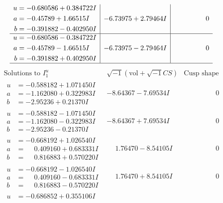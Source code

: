 \documentclass[1p]{elsarticle_modified}
\theoremstyle{definition}
\newcommand{\I}{\sqrt{-1}}
\begin{document}
$$\begin{array}{c|c|c}
\begin{aligned}
u &= -0.680586 + 0.384722 I \\
a &= -0.45789 + 1.66515 I \\
b &= -0.391882 - 0.402950 I\end{aligned}
 & -6.73975 + 2.79464 I & \phantom{-0.000000 } 0 \\ \hline\begin{aligned}
u &= -0.680586 - 0.384722 I \\
a &= -0.45789 - 1.66515 I \\
b &= -0.391882 + 0.402950 I\end{aligned}
 & -6.73975 - 2.79464 I & \phantom{-0.000000 } 0\\
 \hline 
 \end{array}$$\newpage$$\begin{array}{c|c|c}  
\text{Solutions to }I^u_{1}& \I (\text{vol} + \sqrt{-1}CS) & \text{Cusp shape}\\
 \hline 
\begin{aligned}
u &= -0.588182 + 1.071450 I \\
a &= -1.162080 + 0.322983 I \\
b &= -2.95236 + 0.21370 I\end{aligned}
 & -8.64367 - 7.69534 I & \phantom{-0.000000 } 0 \\ \hline\begin{aligned}
u &= -0.588182 - 1.071450 I \\
a &= -1.162080 - 0.322983 I \\
b &= -2.95236 - 0.21370 I\end{aligned}
 & -8.64367 + 7.69534 I & \phantom{-0.000000 } 0 \\ \hline\begin{aligned}
u &= -0.668192 + 1.026540 I \\
a &= \phantom{-}0.409160 + 0.683331 I \\
b &= \phantom{-}0.816883 + 0.570220 I\end{aligned}
 & \phantom{-}1.76470 - 8.54105 I & \phantom{-0.000000 } 0 \\ \hline\begin{aligned}
u &= -0.668192 - 1.026540 I \\
a &= \phantom{-}0.409160 - 0.683331 I \\
b &= \phantom{-}0.816883 - 0.570220 I\end{aligned}
 & \phantom{-}1.76470 + 8.54105 I & \phantom{-0.000000 } 0 \\ \hline\begin{aligned}
u &= -0.686852 + 0.355106 I \\

\end{aligned}
\end{array}$$
\end{document}
